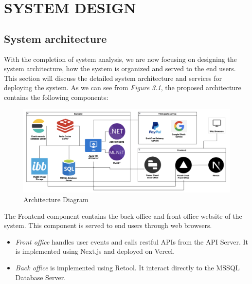 \chapter{SYSTEM DESIGN}

\section{System architecture}
With the completion of system analysis, we are now 
focusing on designing the system architecture, how the system is organized and served to the end users. This section will 
discuss the detailed system architecture and services for deploying the system. As we 
can see from \textit{Figure 3.1}, the proposed architecture contains the 
following components:
\begin{figure}[H]
    \centering
    \includegraphics[width=1\textwidth]{Figures/Deployment/architect-report.png}
    \caption{Architecture Diagram}
    \label{fig:deployment-architecture}
\end{figure}
The Frontend component contains the back office and front office website of the system. This component is served to end users through web browsers.
\begin{itemize}
    \item \textit{Front office} handles user events and calls restful APIs from the API Server. It is implemented using Next.js and deployed on Vercel.
    \item \textit{Back office} is implemented using Retool. It interact directly to the MSSQL Database Server.
\end{itemize}

